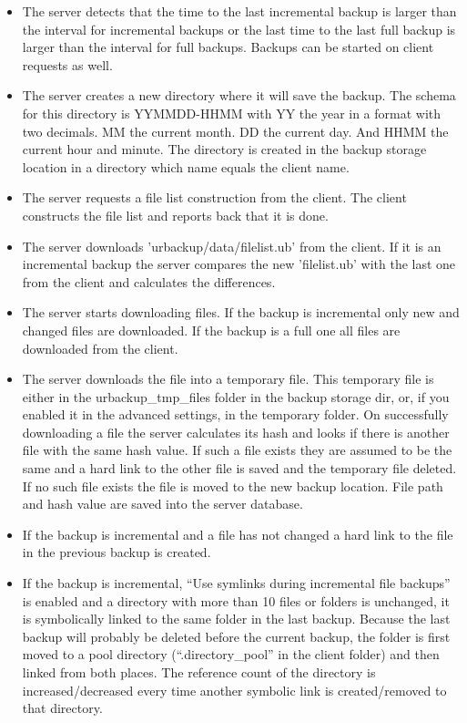 \documentclass[a4paper,10pt]{article}
\begin{document}
\begin{itemize}
\item The server detects that the time to the last incremental backup is larger than the interval for incremental backups or the last time to the last full backup is larger than the interval for full backups. Backups can be started on client requests as well.
\item The server creates a new directory where it will save the backup. The schema for this directory is YYMMDD-HHMM with YY the year in a format with two decimals. MM the current month. DD the current day. And HHMM the current hour and minute. The directory is created in the backup storage location in a directory which name equals the client name.
\item The server requests a file list construction from the client. The client constructs the file list and reports back that it is done. 
\item The server downloads 'urbackup/data/filelist.ub' from the client. If it is an incremental backup the server compares the new 'filelist.ub' with the last one from the client and calculates the differences.
\item The server starts downloading files. If the backup is incremental only new and changed files are downloaded. If the backup is a full one all files are downloaded from the client.
\item The server downloads the file into a temporary file. This temporary file is either in the
urbackup\_tmp\_files folder in the backup storage dir, or, if you enabled it in the advanced
settings, in the temporary folder.
On successfully downloading a file the server calculates its hash and looks if there is another file with the same hash value.
If such a file exists they are assumed to be the same and a hard link to the other file is saved and the temporary file deleted. If no such file exists the file is moved to the new backup location. File path and hash value are saved into the server database.
\item If the backup is incremental and a file has not changed a hard link to the file in the previous backup is created.
\item If the backup is incremental, ``Use symlinks during incremental file backups'' is enabled and a directory with more than 10 files or folders is unchanged, it is symbolically linked to the same folder in the last backup. Because the last backup will probably be deleted before the current backup, the folder is first moved to a pool directory (``.directory\_pool'' in the client folder) and then linked from both places. The reference count of the directory is increased/decreased every time another symbolic link is created/removed to that directory.

\end{itemize}
\end{document}
